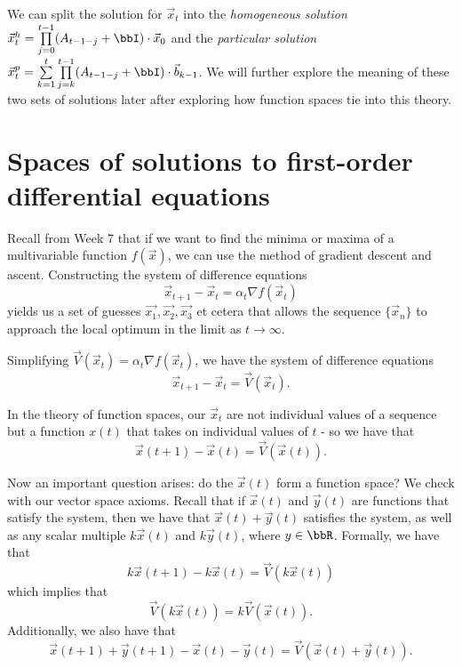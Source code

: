 \documentclass[a4paper, 12pt,oneside,openany]{book}
\begin{document}
We can split the solution for $\vec{x}_t$ into the \emph{homogeneous solution} $\vec{x}_t^h = \prod\limits_{j=0}^{t-1} (A_{t-1-j}+\bbI) \cdot \vec{x}_0$ and the \emph{particular solution} $\vec{x}_t^p=\sum\limits_{k=1}^t \prod\limits_{j=k}^{t-1} (A_{t-1-j}+\bbI) \cdot \vec{b}_{k-1}$. We will further explore the meaning of these two sets of solutions later after exploring how function spaces tie into this theory.

\section{Spaces of solutions to first-order differential equations}

Recall from Week 7 that if we want to find the minima or maxima of a multivariable function $f(\vec{x})$, we can use the method of gradient descent and ascent. Constructing the system of difference equations $$\vec{x}_{t+1} - \vec{x}_t = \alpha_t \nabla f(\vec{x}_t)$$ yields us a set of guesses $\vec{x_1}, \vec{x_2}, \vec{x_3}$ et cetera that allows the sequence $\{\vec{x}_n\}$ to approach the local optimum in the limit as $t\to\infty$.

Simplifying $\vec{V}(\vec{x}_t) = \alpha_t \nabla f(\vec{x}_t)$, we have the system of difference equations \begin{equation} \vec{x}_{t+1}-\vec{x}_t = \vec{V}(\vec{x}_t).\end{equation}

In the theory of function spaces, our $\vec{x}_t$ are not individual values of a sequence but a function $x(t)$ that takes on individual values of $t$ - so we have that $$ \vec{x}(t+1)-\vec{x}(t) = \vec{V}(\vec{x}(t)).$$

Now an important question arises: do the $\vec{x}(t)$ form a function space? We check with our vector space axioms. Recall that if $\vec{x}(t)$ and $\vec{y}(t)$ are functions that satisfy the system, then we have that $\vec{x}(t)+\vec{y}(t)$ satisfies the system, as well as any scalar multiple $k\vec{x}(t)$ and $k\vec{y}(t)$, where $y\in\bbR$. Formally, we have that $$k\vec{x}(t+1) - k\vec{x}(t) = \vec{V}(k\vec{x}(t))$$ which implies that $$\vec{V}(k\vec{x}(t)) = k\vec{V}(\vec{x}(t)).$$ Additionally, we also have that $$\vec{x}(t+1)+\vec{y}(t+1)-\vec{x}(t)-\vec{y}(t) = \vec{V}(\vec{x}(t)+\vec{y}(t)).$$

\end{document}
